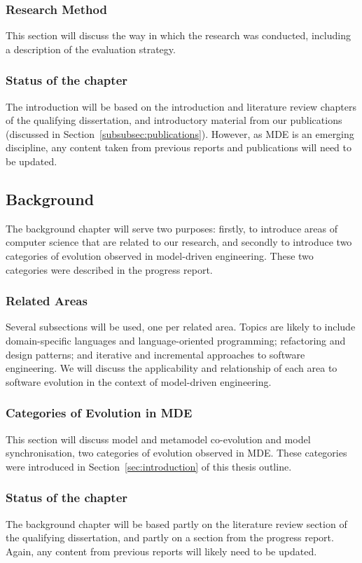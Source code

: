 \subsubsection{Research Method}
This section will discuss the way in which the research was conducted, including a description of the evaluation strategy.

\subsubsection{Status of the chapter}
The introduction will be based on the introduction and literature review chapters of the qualifying dissertation, and introductory material from our publications (discussed in Section~\ref{subsubsec:publications}). However, as MDE is an emerging discipline, any content taken from previous reports and publications will need to be updated.


\subsection{Background}
The background chapter will serve two purposes: firstly, to introduce areas of computer science that are related to our research, and secondly to introduce two categories of evolution observed in model-driven engineering. These two categories were described in the progress report.

\subsubsection{Related Areas}
Several subsections will be used, one per related area. Topics are likely to include domain-specific languages and language-oriented programming; refactoring and design patterns; and iterative and incremental approaches to software engineering. We will discuss the applicability and relationship of each area to software evolution in the context of model-driven engineering.

\subsubsection{Categories of Evolution in MDE}
This section will discuss model and metamodel co-evolution and model synchronisation, two categories of evolution observed in MDE. These categories were introduced in Section~\ref{sec:introduction} of this thesis outline.

\subsubsection{Status of the chapter}
The background chapter will be based partly on the literature review section of the qualifying dissertation, and partly on a section from the progress report. Again, any content from previous reports will likely need to be updated.


